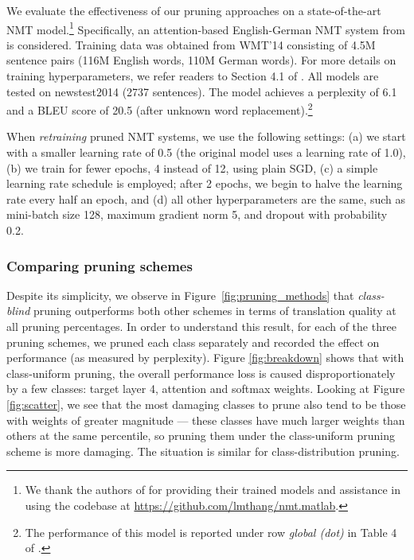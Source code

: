 
We evaluate the effectiveness of our pruning approaches on a state-of-the-art
NMT model.\footnote{We thank the authors of \cite{luong15attn}
for providing their trained models and assistance in using the codebase
at \url{https://github.com/lmthang/nmt.matlab}.} 
Specifically, an attention-based English-German NMT system from
\cite{luong15attn} is considered. 
Training data was obtained from WMT'14 consisting
of 4.5M sentence pairs (116M English words, 110M German words). For
more details on training hyperparameters, we refer readers to Section 4.1 of
\cite{luong15attn}.
All models are tested on newstest2014 (2737 sentences). 
The model achieves a
perplexity of 6.1 and a BLEU score of
20.5 (after unknown word replacement).\footnote{The performance of this model
is reported under row {\it global (dot)} in Table 4 of
\cite{luong15attn}.}

When {\it retraining} pruned NMT systems, we use the following settings: (a) we start
with a smaller learning rate of 0.5 (the original model uses a learning rate of
1.0), (b) we train for fewer epochs, 4 instead of 12, using plain SGD, (c) a simple learning
rate schedule is employed; after 2 epochs, we begin to halve the learning rate
every half an epoch, and (d) all other hyperparameters are the same, such as
mini-batch size 128, maximum gradient norm 5, and dropout with probability 0.2.

\subsubsection{Comparing pruning schemes}
\label{subsubsec:exp_schemes}
Despite its simplicity, we observe in Figure~\ref{fig:pruning_methods} that {\it
class-blind} pruning outperforms both other schemes in terms of translation
quality at all pruning percentages.
In order to understand this result, for each of the three pruning schemes, we pruned each class separately and recorded the effect on performance (as measured by perplexity).
Figure \ref{fig:breakdown} shows that with class-uniform pruning, the overall performance loss is caused disproportionately by a few classes: target layer 4, attention and softmax weights. Looking at Figure \ref{fig:scatter}, we see that the most damaging classes to prune also tend to be those with weights of greater magnitude --- these classes have much larger weights than others at the same percentile, so pruning them under the class-uniform pruning scheme is more damaging. The situation is similar for class-distribution pruning.



